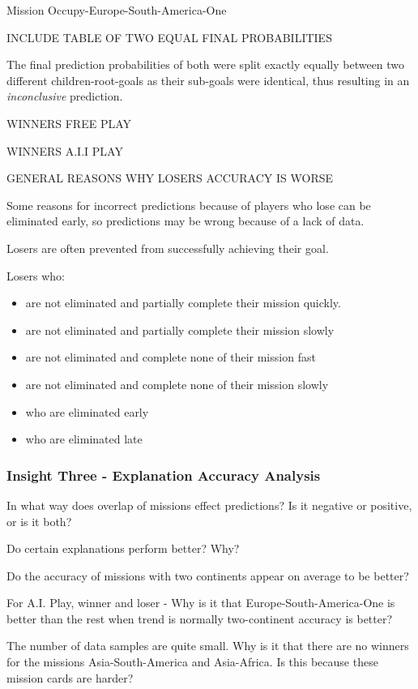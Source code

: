 \documentclass[parskip]{cs4rep}
\begin{document}
Mission Occupy-Europe-South-America-One

INCLUDE TABLE OF TWO EQUAL FINAL PROBABILITIES

The final prediction probabilities of both were split exactly equally between two different children-root-goals as their sub-goals were identical, thus resulting in an \textit{inconclusive} prediction.

WINNERS FREE PLAY

WINNERS A.I.I PLAY

GENERAL REASONS WHY LOSERS ACCURACY IS WORSE

Some reasons for incorrect predictions because of players who lose can be eliminated early, so predictions may be wrong because of a lack of data.

Losers are often prevented from successfully achieving their goal.

Losers who:

\begin{itemize}
\item
are not eliminated and partially complete their mission quickly.
\item
are not eliminated and partially complete their mission slowly
\item
are not eliminated and complete none of their mission fast
\item
are not eliminated and complete none of their mission slowly
\item
who are eliminated early
\item
who are eliminated late
\end{itemize}

\subsubsection{Insight Three - Explanation Accuracy Analysis}

In what way does overlap of missions effect predictions? Is it negative or positive, or is it both?

Do certain explanations perform better? Why?
 
Do the accuracy of missions with two continents appear on average to be better?

For A.I. Play, winner and loser - Why is it that Europe-South-America-One is better than the rest when trend is normally two-continent accuracy is better?

The number of data samples are quite small.	Why is it that there are no winners for the missions Asia-South-America and Asia-Africa. Is this because these mission cards are harder?
\end{document}
